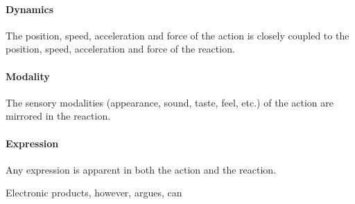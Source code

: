 \paragraph{Dynamics} The position, speed, acceleration and force of the action is closely coupled to the position, speed, acceleration and force of the reaction.
\paragraph{Modality} The sensory modalities (appearance, sound, taste, feel, etc.) of the action are mirrored in the reaction.
\paragraph{Expression} Any expression is apparent in both the action and the reaction.

Electronic products, however,  argues, can







\newpage

